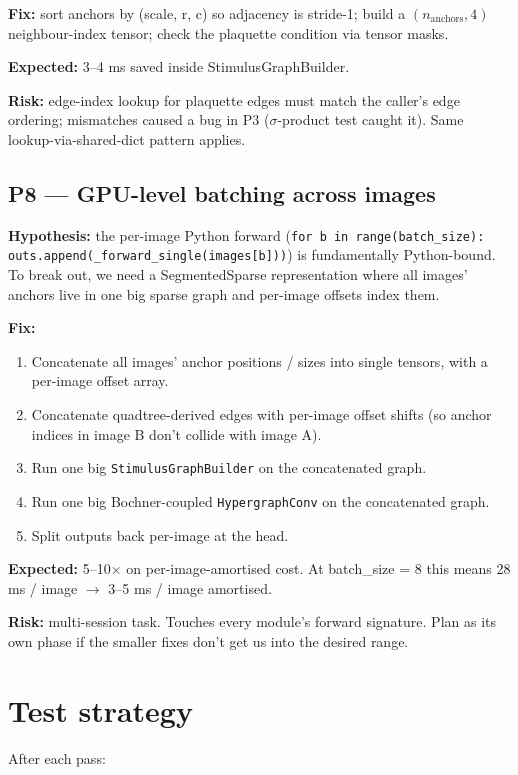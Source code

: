 \documentclass[11pt,a4paper]{article}
\begin{document}
\textbf{Fix:} sort anchors by (scale, r, c) so adjacency is
stride-1; build a $(n_\text{anchors}, 4)$ neighbour-index tensor;
check the plaquette condition via tensor masks.

\textbf{Expected:} 3--4 ms saved inside StimulusGraphBuilder.

\textbf{Risk:} edge-index lookup for plaquette edges must match
the caller's edge ordering; mismatches caused a bug in P3
($\sigma$-product test caught it). Same lookup-via-shared-dict
pattern applies.

\subsection{P8 --- GPU-level batching across images}

\textbf{Hypothesis:} the per-image Python forward (\texttt{for b in
range(batch\_size): outs.append(\_forward\_single(images[b]))}) is
fundamentally Python-bound. To break out, we need a
SegmentedSparse representation where all images' anchors live in
one big sparse graph and per-image offsets index them.

\textbf{Fix:}
\begin{enumerate}
\item Concatenate all images' anchor positions / sizes into single
  tensors, with a per-image offset array.
\item Concatenate quadtree-derived edges with per-image offset
  shifts (so anchor indices in image B don't collide with image A).
\item Run one big \texttt{StimulusGraphBuilder} on the concatenated
  graph.
\item Run one big Bochner-coupled \texttt{HypergraphConv} on the
  concatenated graph.
\item Split outputs back per-image at the head.
\end{enumerate}

\textbf{Expected:} 5--10$\times$ on per-image-amortised cost. At
batch\_size = 8 this means 28 ms / image $\to$ 3--5 ms / image
amortised.

\textbf{Risk:} multi-session task. Touches every module's forward
signature. Plan as its own phase if the smaller fixes don't get
us into the desired range.

\section{Test strategy}

After each pass:
\end{document}
